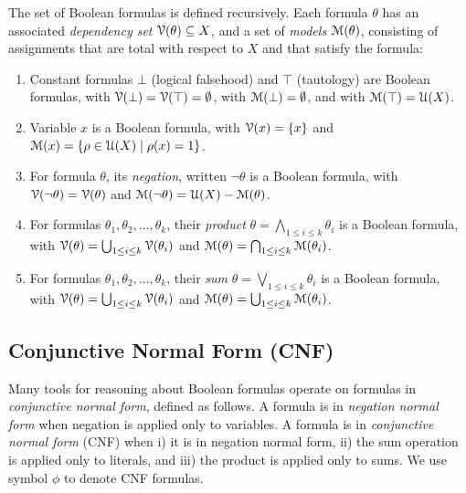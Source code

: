 \documentclass[letterpaper,USenglish,cleveref, autoref, thm-restate]{lipics-v2021}
\newcommand{\boolnot}{\neg}
\newcommand{\tautology}{\top}
\newcommand{\nil}{\bot}
\newcommand{\varset}{X}
\newcommand{\dependencyset}{{\cal V}}
\newcommand{\assign}{\rho}
\newcommand{\uassign}{{\cal U}}
\newcommand{\modelset}{{\cal M}}
\begin{document}
\begin{definition}
  The set of Boolean formulas is defined recursively.  Each
  formula $\theta$ has an associated \emph{dependency set}
  $\dependencyset(\theta)  \subseteq \varset$, and a set of \emph{models} $\modelset(\theta)$,
  consisting of assignments that are total with respect to $\varset$ and that satisfy the formula:
  \begin{enumerate}
  \item Constant formulas $\nil$ (logical falsehood) and $\tautology$ (tautology) are Boolean formulas,
    with $\dependencyset(\nil) = \dependencyset(\tautology) = \emptyset$, with $\modelset(\nil) = \emptyset$, and with $\modelset(\tautology) = \uassign(\varset)$.
  \item Variable $x$ is a Boolean formula, with $\dependencyset(x) = \{x\}$
    and $\modelset(x) = \{\assign \in \uassign(\varset) \mid  \assign(x)=1\}$.
  \item For formula $\theta$, its \emph{negation}, written $\boolnot \theta$ is a Boolean formula,
    with $\dependencyset(\boolnot \theta) = \dependencyset(\theta)$ and $\modelset(\boolnot \theta) = \uassign(\varset) - \modelset(\theta)$.
  \item For formulas $\theta_1, \theta_2, \ldots, \theta_k$, their \emph{product} $\theta = \bigwedge_{1 \leq i \leq k} \theta_i$ is a Boolean formula, with
      $\dependencyset(\theta) = \bigcup_{1 \leq i \leq k} \dependencyset(\theta_i)$ and
      $\modelset(\theta) = \bigcap_{1 \leq i \leq k} \modelset(\theta_i)$.
  \item For formulas $\theta_1, \theta_2, \ldots, \theta_k$, their \emph{sum} $\theta = \bigvee_{1 \leq i \leq k} \theta_i$ is a Boolean formula, with
      $\dependencyset(\theta) = \bigcup_{1 \leq i \leq k} \dependencyset(\theta_i)$ and
      $\modelset(\theta) = \bigcup_{1 \leq i \leq k} \modelset(\theta_i)$.
  \end{enumerate}
\label{def:boolean}
\end{definition}

\subsection{Conjunctive Normal Form (CNF)}

  Many tools for reasoning about Boolean formulas operate on formulas in \emph{conjunctive normal form}, defined as follows.
  A formula is in  \emph{negation normal form} when negation is applied only to variables.  A
  formula is in \emph{conjunctive normal form} (CNF) when i) it is in
  negation normal form, ii) the sum operation is applied only to literals, and iii) the product is applied only to sums.  We use symbol $\phi$ to denote CNF formulas.
\end{document}
